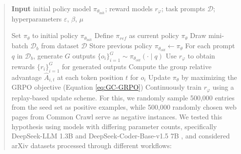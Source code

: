 \begin{itemize}[topsep=0pt]
\begin{itemize}[topsep=0pt]
\begin{itemize}[topsep=0pt]
\begin{abstract}
\begin{itemize}[topsep=0pt]
\begin{itemize}[topsep=0pt]
\begin{algorithm}[t]
  \small
  \caption{Iterative Group Relative Policy Optimization}
  \textbf{Input} initial policy model $\pi_{\theta_{\text{init}}}$; reward models $r_\varphi$; task prompts $\mathcal{D}$; 
  hyperparameters $\varepsilon$, $\beta$, $\mu$
  \begin{algorithmic}[1]
    \State Set $\pi_\theta$ to initial policy $\pi_{\theta_{\text{init}}}$
       \State Define $\pi_{ref}$ as current policy $\pi_{\theta}$
      \State Draw mini-batch $\mathcal{D}_b$ from dataset $\mathcal{D}$
      \State Store previous policy $\pi_{\theta_{old}} \leftarrow \pi_{\theta}$ 
      \State For each prompt $q$ in $\mathcal{D}_b$, generate $G$ outputs $\{o_i\}_{i=1}^G \sim \pi_{\theta_{old}} (\cdot \mid q)$
      \State Use $r_{\varphi}$ to obtain rewards $\{r_i\}_{i=1}^G$ for generated outputs
      \State Compute the group relative advantage $\hat{A}_{i,t}$ at each token position $t$ for $o_i$
        \State Update $\pi_\theta$ by maximizing the GRPO objective (Equation \ref{eq:GC-GRPO})
      \EndFor
    \EndFor \State Continuously train $r_\varphi$ using a replay-based update scheme. For this, we randomly sample 500,000 entries from the seed set as positive examples, while 500,000 randomly chosen web pages from Common Crawl serve as negative instances. We tested this hypothesis using models with differing parameter counts, specifically DeepSeek-LLM 1.3B and DeepSeek-Coder-Base-v1.5 7B \citep{deepseek-coder}, and considered arXiv datasets processed through different workflows:


\end{algorithmic}
\end{algorithm}
\end{itemize}
\end{itemize}
\end{abstract}
\end{itemize}
\end{itemize}
\end{itemize}
